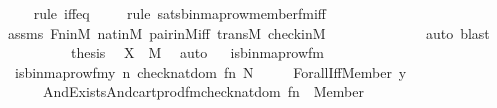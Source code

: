 \begin{isabellebody}
\ \ \ \ \isamarkupfalse%
{\isacharparenleft}{\kern0pt}rule\ iff{\isacharunderscore}{\kern0pt}eq{\isacharparenright}{\kern0pt}\isanewline
\ \ \ \ \isamarkupfalse%
{\isacharparenleft}{\kern0pt}rule\ sats{\isacharunderscore}{\kern0pt}binmap{\isacharunderscore}{\kern0pt}row{\isacharprime}{\kern0pt}{\isacharunderscore}{\kern0pt}member{\isacharunderscore}{\kern0pt}fm{\isacharunderscore}{\kern0pt}iff{\isacharparenright}{\kern0pt}\isanewline
\ \ \ \ \isamarkupfalse%
\ assms\ Fn{\isacharunderscore}{\kern0pt}in{\isacharunderscore}{\kern0pt}M\ nat{\isacharunderscore}{\kern0pt}in{\isacharunderscore}{\kern0pt}M\ pair{\isacharunderscore}{\kern0pt}in{\isacharunderscore}{\kern0pt}M{\isacharunderscore}{\kern0pt}iff\ transM\ check{\isacharunderscore}{\kern0pt}in{\isacharunderscore}{\kern0pt}M\isanewline
\ \ \ \ \ \ \ \ \ \ \ \ \isamarkupfalse%
\ {\isacharparenleft}{\kern0pt}auto{\isacharcomma}{\kern0pt}\ blast{\isacharparenright}{\kern0pt}\isanewline
\ \ \ \ \isamarkupfalse%
\isanewline
\isanewline
\ \ \isamarkupfalse%
\ \isamarkupfalse%
\ {\isacharquery}{\kern0pt}thesis\ \isamarkupfalse%
\ {\isacartoucheopen}X\ {\isasymin}\ M{\isacartoucheclose}\ \isamarkupfalse%
\ auto\isanewline
{}\isamarkupfalse%
%
\endisatagproof
{\isafoldproof}%
%
\isadelimproof
\ \isanewline
%
\endisadelimproof
\isanewline
{}\isamarkupfalse%
\ is{\isacharunderscore}{\kern0pt}binmap{\isacharunderscore}{\kern0pt}row{\isacharprime}{\kern0pt}{\isacharunderscore}{\kern0pt}fm\ \ \isanewline
\ \ {\isachardoublequoteopen}is{\isacharunderscore}{\kern0pt}binmap{\isacharunderscore}{\kern0pt}row{\isacharprime}{\kern0pt}{\isacharunderscore}{\kern0pt}fm{\isacharparenleft}{\kern0pt}y{\isacharcomma}{\kern0pt}\ n{\isacharcomma}{\kern0pt}\ checknatdom{\isacharcomma}{\kern0pt}\ fn{\isacharcomma}{\kern0pt}\ N{\isacharparenright}{\kern0pt}\ {\isasymequiv}\isanewline
\ \ \ \ Forall{\isacharparenleft}{\kern0pt}Iff{\isacharparenleft}{\kern0pt}Member{\isacharparenleft}{\kern0pt}{}{\isacharcomma}{\kern0pt}\ y{\isacharhash}{\kern0pt}{\isacharplus}{\kern0pt}{}{\isacharparenright}{\kern0pt}{\isacharcomma}{\kern0pt}\ \isanewline
\ \ \ \ \ \ And{\isacharparenleft}{\kern0pt}Exists{\isacharparenleft}{\kern0pt}And{\isacharparenleft}{\kern0pt}cartprod{\isacharunderscore}{\kern0pt}fm{\isacharparenleft}{\kern0pt}checknatdom{\isacharhash}{\kern0pt}{\isacharplus}{\kern0pt}{}{\isacharcomma}{\kern0pt}\ fn{\isacharhash}{\kern0pt}{\isacharplus}{\kern0pt}{}{\isacharcomma}{\kern0pt}\ {}{\isacharparenright}{\kern0pt}{\isacharcomma}{\kern0pt}\ Member{\isacharparenleft}{\kern0pt}{}{\isacharcomma}{\kern0pt}\ {}{\isacharparenright}{\kern0pt}{\isacharparenright}{\kern0pt}{\isacharparenright}{\kern0pt}{\isacharcomma}{\kern0pt}\ \ \isanewline

\end{isabellebody}
